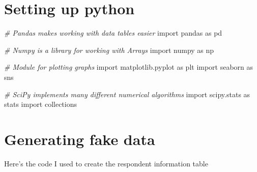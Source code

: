 \documentclass[]{book}
\newenvironment{Shaded}{\begin{snugshade}}{\end{snugshade}}
\newcommand{\CommentTok}[1]{\textcolor[rgb]{0.56,0.35,0.01}{\textit{#1}}}
\newcommand{\NormalTok}[1]{#1}
\begin{document}
\chapter{Setting up python}\label{appendixB}

\begin{Shaded}
\begin{Highlighting}[]
\CommentTok{# Pandas makes working with data tables easier}
\NormalTok{import pandas as pd}

\CommentTok{# Numpy is a library for working with Arrays}
\NormalTok{import numpy as np}

\CommentTok{# Module for plotting graphs}
\NormalTok{import matplotlib.pyplot as plt}
\NormalTok{import seaborn as sns}

\CommentTok{# SciPy implements many different numerical algorithms}
\NormalTok{import scipy.stats as stats}
\NormalTok{import collections}
\end{Highlighting}
\end{Shaded}

\hypertarget{appendixC}{\chapter{Generating fake data}\label{appendixC}}

Here's the code I used to create the respondent information table
\end{document}
